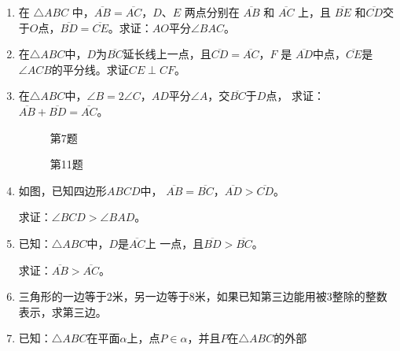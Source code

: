 \begin{enumerate}
\item 在 $\triangle ABC$ 中，$\overline{AB}=\overline{AC}$，$D$、$E$ 两点分别在 $\overline{AB}$ 和 $\overline{AC}$ 上，且 $\overline{BE}$
和$\overline{CD}$交于$O$点，$\overline{BD}=\overline{CE}$。求证：$AO$平分$\angle BAC$。
\item 在$\triangle ABC$中，$D$为$\overline{BC}$延长线上一点，且$\overline{CD}=\overline{AC}$，$F$
是
$\overline{AD}$中点，$\overline{CE}$是$\angle ACB$的平分线。求证$CE\perp CF$。

\item 在$\triangle ABC$中，$\angle B=2\angle C$，$AD$平分$\angle A$，交$\overline{BC}$于$D$点，
求证：$\overline{AB}+\overline{BD}=\overline{AC}$。

\begin{figure}
    \begin{minipage}[t]{0.48\linewidth}
    \centering
\begin{tikzpicture}[>=latex, scale=1]
    \end{tikzpicture}
    \caption*{第7题}
    \end{minipage}
    \begin{minipage}[t]{0.48\linewidth}
    \centering
    \begin{tikzpicture}[>=latex, scale=1]
    \end{tikzpicture}
    \caption*{第11题}
    \end{minipage}
    \end{figure}

\item 如图，已知四边形$ABCD$中，
$\overline{AB}=\overline{BC}$，$\overline{AD}>\overline{CD}$。

求证：$\angle BCD>\angle BAD$。
\item 已知：$\triangle ABC$中，$D$是$\overline{AC}$上
一点，且$\overline{BD}>\overline{BC}$。

求证：$\overline{AB}>\overline{AC}$。
\item 三角形的一边等于2米，另一边等于8米，如果已知第三边能用被3整除的整数表示，求第三边。
\item 已知：$\triangle ABC$在平面$\alpha$上，点$P\in\alpha$，并且$P$在$\triangle ABC$的外部


\end{enumerate}
